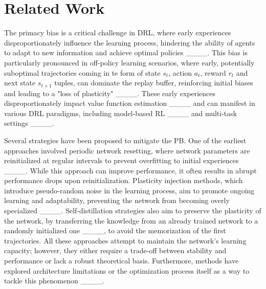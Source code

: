 \section{Related Work}
The primacy bias is a critical challenge in DRL, where early experiences disproportionately influence the learning process, hindering the ability of agents to adapt to new information and achieve optimal policies ____. This bias is particularly pronounced in off-policy learning scenarios, where early, potentially suboptimal trajectories coming in te form of state $s_t$, action $a_t$, reward $r_t$ and next state $s_{t+1}$ tuples, can dominate the replay buffer, reinforcing initial biases and leading to a "loss of plasticity" ____. These early experiences disproportionately impact value function estimation ____ and can manifest in various DRL paradigms, including model-based RL ____ and multi-task settings ____.

Several strategies have been proposed to mitigate the PB. One of the earliest approaches involved periodic network resetting, where network parameters are reinitialized at regular intervals to prevent overfitting to initial experiences ____. While this approach can improve performance, it often results in abrupt performance drops upon reinitialization. Plasticity injection methods, which introduce pseudo-random noise in the learning process, aim to promote ongoing learning and adaptability, preventing the network from becoming overly specialized ____. Self-distillation strategies also aim to preserve the plasticity of the network, by transferring the knowledge from an already trained network to a randomly initialized one ____, to avoid the memorization of the first trajectories. All these approaches attempt to maintain the network's learning capacity; however, they either require a trade-off between stability and performance or lack a robust theoretical basis. Furthermore, methods have explored architecture limitations or the optimization process itself as a way to tackle this phenomenon ____.

